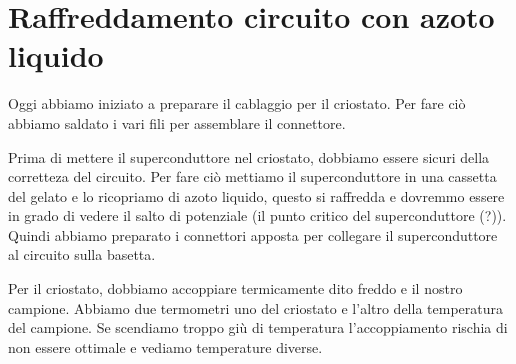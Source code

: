 \documentclass[../main/main.tex]{subfiles}
\begin{document}


\section{Raffreddamento circuito con azoto liquido}

Oggi abbiamo iniziato a preparare il cablaggio per il criostato. Per fare ciò abbiamo saldato i vari fili per assemblare il connettore.

Prima di mettere il superconduttore nel criostato, dobbiamo essere sicuri della corretteza del circuito. Per fare ciò mettiamo il superconduttore in una cassetta del gelato e lo ricopriamo di azoto liquido, questo si raffredda e dovremmo essere in grado di vedere il salto di potenziale (il punto critico del superconduttore (?)). Quindi abbiamo preparato i connettori apposta per collegare il superconduttore al circuito sulla basetta.


Per il criostato, dobbiamo accoppiare termicamente dito freddo e il nostro campione. Abbiamo due termometri uno del criostato e l'altro della temperatura del campione. Se scendiamo troppo giù di temperatura l'accoppiamento rischia di non essere ottimale e vediamo temperature diverse.
\end{document}
